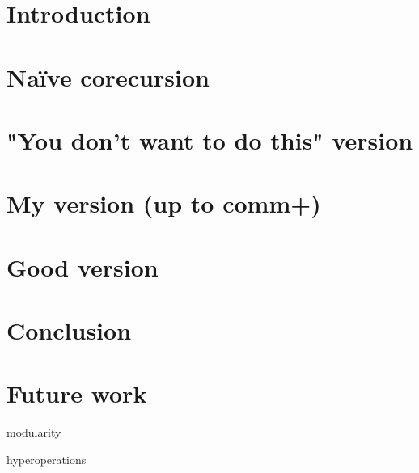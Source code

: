 \documentclass[sigplan, screen, review]{acmart}
\begin{document}

\maketitle

\section{Introduction}\label{sec:intro}


\section{Naïve corecursion}\label{sec:problem}



\section{"You don't want to do this" version}\label{sec:direct}



\section{My version (up to comm+)}\label{sec:dsl}



\section{Good version}\label{sec:quotiented}



\section{Conclusion}

\section{Future work}

modularity

hyperoperations



\end{document}
